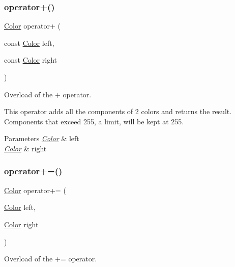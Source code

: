\subsubsection{\texorpdfstring{operator+()}{operator+()}}
{\footnotesize\ttfamily \hyperlink{classjetfuel_1_1draw_1_1Color}{Color} operator+ (\begin{DoxyParamCaption}\item[{const \hyperlink{classjetfuel_1_1draw_1_1Color}{Color}}]{left,  }\item[{const \hyperlink{classjetfuel_1_1draw_1_1Color}{Color}}]{right }\end{DoxyParamCaption})\hspace{0.3cm}{\ttfamily [related]}}



Overload of the + operator. 

This operator adds all the components of 2 colors and returns the result. Components that exceed 255, a limit, will be kept at 255.


\begin{DoxyParams}{Parameters}
{\em \hyperlink{classjetfuel_1_1draw_1_1Color}{Color}} & left \\
\hline
{\em \hyperlink{classjetfuel_1_1draw_1_1Color}{Color}} & right \\
\hline
\end{DoxyParams}
\mbox{\label{classjetfuel_1_1draw_1_1Color_a226f4b8ca4054f4cb338e7c33bbc71c5}} 
\subsubsection{\texorpdfstring{operator+=()}{operator+=()}}
{\footnotesize\ttfamily \hyperlink{classjetfuel_1_1draw_1_1Color}{Color} operator+= (\begin{DoxyParamCaption}\item[{\hyperlink{classjetfuel_1_1draw_1_1Color}{Color}}]{left,  }\item[{\hyperlink{classjetfuel_1_1draw_1_1Color}{Color}}]{right }\end{DoxyParamCaption})\hspace{0.3cm}{\ttfamily [related]}}



Overload of the += operator. 


